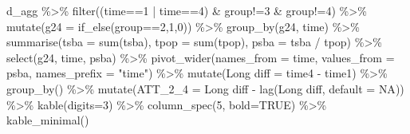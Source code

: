 \documentclass[
]{article}
\newenvironment{Shaded}{\begin{snugshade}}{\end{snugshade}}
\newcommand{\AttributeTok}[1]{\textcolor[rgb]{0.77,0.63,0.00}{#1}}
\newcommand{\ConstantTok}[1]{\textcolor[rgb]{0.00,0.00,0.00}{#1}}
\newcommand{\DecValTok}[1]{\textcolor[rgb]{0.00,0.00,0.81}{#1}}
\newcommand{\FunctionTok}[1]{\textcolor[rgb]{0.00,0.00,0.00}{#1}}
\newcommand{\NormalTok}[1]{#1}
\newcommand{\OtherTok}[1]{\textcolor[rgb]{0.56,0.35,0.01}{#1}}
\newcommand{\SpecialCharTok}[1]{\textcolor[rgb]{0.00,0.00,0.00}{#1}}
\newcommand{\StringTok}[1]{\textcolor[rgb]{0.31,0.60,0.02}{#1}}
\begin{document}
\begin{Shaded}
\begin{Highlighting}[]
\NormalTok{d\_agg }\SpecialCharTok{\%\textgreater{}\%} \FunctionTok{filter}\NormalTok{((time}\SpecialCharTok{==}\DecValTok{1} \SpecialCharTok{|}\NormalTok{ time}\SpecialCharTok{==}\DecValTok{4}\NormalTok{) }\SpecialCharTok{\&}\NormalTok{ group}\SpecialCharTok{!=}\DecValTok{3} \SpecialCharTok{\&}\NormalTok{ group}\SpecialCharTok{!=}\DecValTok{4}\NormalTok{) }\SpecialCharTok{\%\textgreater{}\%}
  \FunctionTok{mutate}\NormalTok{(}\AttributeTok{g24 =} \FunctionTok{if\_else}\NormalTok{(group}\SpecialCharTok{==}\DecValTok{2}\NormalTok{,}\DecValTok{1}\NormalTok{,}\DecValTok{0}\NormalTok{)) }\SpecialCharTok{\%\textgreater{}\%}
  \FunctionTok{group\_by}\NormalTok{(g24, time) }\SpecialCharTok{\%\textgreater{}\%}
  \FunctionTok{summarise}\NormalTok{(}\AttributeTok{tsba =} \FunctionTok{sum}\NormalTok{(tsba),}
            \AttributeTok{tpop =} \FunctionTok{sum}\NormalTok{(tpop),}
            \AttributeTok{psba =}\NormalTok{ tsba }\SpecialCharTok{/}\NormalTok{ tpop) }\SpecialCharTok{\%\textgreater{}\%}
  \FunctionTok{select}\NormalTok{(g24, time, psba) }\SpecialCharTok{\%\textgreater{}\%}
  \FunctionTok{pivot\_wider}\NormalTok{(}\AttributeTok{names\_from =}\NormalTok{ time, }\AttributeTok{values\_from =}\NormalTok{ psba,}
              \AttributeTok{names\_prefix =} \StringTok{"time"}\NormalTok{) }\SpecialCharTok{\%\textgreater{}\%}
  \FunctionTok{mutate}\NormalTok{(}\StringTok{\textasciigrave{}}\AttributeTok{Long diff}\StringTok{\textasciigrave{}} \OtherTok{=} \StringTok{\textasciigrave{}}\AttributeTok{time4}\StringTok{\textasciigrave{}} \SpecialCharTok{{-}} \StringTok{\textasciigrave{}}\AttributeTok{time1}\StringTok{\textasciigrave{}}\NormalTok{) }\SpecialCharTok{\%\textgreater{}\%}
  \FunctionTok{group\_by}\NormalTok{() }\SpecialCharTok{\%\textgreater{}\%}
  \FunctionTok{mutate}\NormalTok{(}\AttributeTok{ATT\_2\_4 =} \StringTok{\textasciigrave{}}\AttributeTok{Long diff}\StringTok{\textasciigrave{}} \SpecialCharTok{{-}} \FunctionTok{lag}\NormalTok{(}\StringTok{\textasciigrave{}}\AttributeTok{Long diff}\StringTok{\textasciigrave{}}\NormalTok{, }\AttributeTok{default =} \ConstantTok{NA}\NormalTok{)) }\SpecialCharTok{\%\textgreater{}\%}
  \FunctionTok{kable}\NormalTok{(}\AttributeTok{digits=}\DecValTok{3}\NormalTok{) }\SpecialCharTok{\%\textgreater{}\%}
  \FunctionTok{column\_spec}\NormalTok{(}\DecValTok{5}\NormalTok{, }\AttributeTok{bold=}\ConstantTok{TRUE}\NormalTok{) }\SpecialCharTok{\%\textgreater{}\%}
  \FunctionTok{kable\_minimal}\NormalTok{()}
\end{Highlighting}
\end{Shaded}
\end{document}
